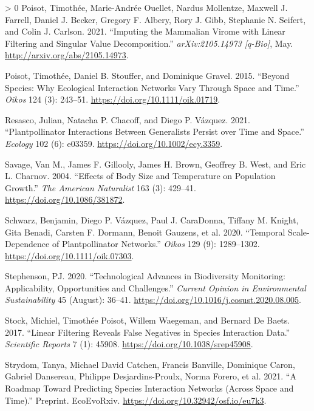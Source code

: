 \documentclass[11pt]{article}
\newlength{\cslhangindent}
\newenvironment{CSLReferences}[3] %
 {%
  \setlength{\parindent}{0pt}
  \ifodd #1 \everypar{\setlength{\hangindent}{\cslhangindent}}\ignorespaces\fi
  \ifnum #2 > 0
  \setlength{\parskip}{#2\baselineskip}
  \fi
 }%
 {}
\begin{document}
\begin{CSLReferences}{1}{0}
\leavevmode\hypertarget{ref-Poisot2021ImpMam}{}%
Poisot, Timothée, Marie-Andrée Ouellet, Nardus Mollentze, Maxwell J.
Farrell, Daniel J. Becker, Gregory F. Albery, Rory J. Gibb, Stephanie N.
Seifert, and Colin J. Carlson. 2021. {``Imputing the Mammalian Virome
with Linear Filtering and Singular Value Decomposition.''}
\emph{arXiv:2105.14973 {[}q-Bio{]}}, May.
\url{http://arxiv.org/abs/2105.14973}.

\leavevmode\hypertarget{ref-Poisot2015SpeWhy}{}%
Poisot, Timothée, Daniel B. Stouffer, and Dominique Gravel. 2015.
{``Beyond Species: Why Ecological Interaction Networks Vary Through
Space and Time.''} \emph{Oikos} 124 (3): 243--51.
\url{https://doi.org/10.1111/oik.01719}.

\leavevmode\hypertarget{ref-Resasco2021PlaPol}{}%
Resasco, Julian, Natacha P. Chacoff, and Diego P. Vázquez. 2021.
{``Plantpollinator Interactions Between Generalists Persist over Time
and Space.''} \emph{Ecology} 102 (6): e03359.
\url{https://doi.org/10.1002/ecy.3359}.

\leavevmode\hypertarget{ref-Savage2004EffBod}{}%
Savage, Van M., James F. Gillooly, James H. Brown, Geoffrey B. West, and
Eric L. Charnov. 2004. {``Effects of Body Size and Temperature on
Population Growth.''} \emph{The American Naturalist} 163 (3): 429--41.
\url{https://doi.org/10.1086/381872}.

\leavevmode\hypertarget{ref-Schwarz2020TemSca}{}%
Schwarz, Benjamin, Diego P. Vázquez, Paul J. CaraDonna, Tiffany M.
Knight, Gita Benadi, Carsten F. Dormann, Benoit Gauzens, et al. 2020.
{``Temporal Scale-Dependence of Plantpollinator Networks.''}
\emph{Oikos} 129 (9): 1289--1302.
\url{https://doi.org/10.1111/oik.07303}.

\leavevmode\hypertarget{ref-Stephenson2020TecAdv}{}%
Stephenson, PJ. 2020. {``Technological Advances in Biodiversity
Monitoring: Applicability, Opportunities and Challenges.''}
\emph{Current Opinion in Environmental Sustainability} 45 (August):
36--41. \url{https://doi.org/10.1016/j.cosust.2020.08.005}.

\leavevmode\hypertarget{ref-Stock2017LinFil}{}%
Stock, Michiel, Timothée Poisot, Willem Waegeman, and Bernard De Baets.
2017. {``Linear Filtering Reveals False Negatives in Species Interaction
Data.''} \emph{Scientific Reports} 7 (1): 45908.
\url{https://doi.org/10.1038/srep45908}.

\leavevmode\hypertarget{ref-Strydom2021RoaPre}{}%
Strydom, Tanya, Michael David Catchen, Francis Banville, Dominique
Caron, Gabriel Dansereau, Philippe Desjardins-Proulx, Norma Forero, et
al. 2021. {``A Roadmap Toward Predicting Species Interaction Networks
(Across Space and Time).''} Preprint. EcoEvoRxiv.
\url{https://doi.org/10.32942/osf.io/eu7k3}.


\end{CSLReferences}
\end{document}
